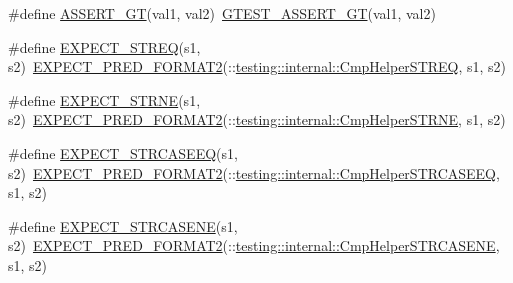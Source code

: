 \begin{DoxyCompactItemize}
\item 
\#define \mbox{\hyperlink{_obj__test_2lib_2googletest-release-1_88_81_2googletest_2include_2gtest_2gtest_8h_a16a882d4eafc9f8643867aea40879140}{A\+S\+S\+E\+R\+T\+\_\+\+GT}}(val1,  val2)~\mbox{\hyperlink{_obj__test_2lib_2googletest-release-1_88_81_2googletest_2include_2gtest_2gtest_8h_a088b9056fd1c1f316b41c22f64deb33a}{G\+T\+E\+S\+T\+\_\+\+A\+S\+S\+E\+R\+T\+\_\+\+GT}}(val1, val2)
\item 
\#define \mbox{\hyperlink{_obj__test_2lib_2googletest-release-1_88_81_2googletest_2include_2gtest_2gtest_8h_ad20f7b94ac5081e16f0005b94e95f0c6}{E\+X\+P\+E\+C\+T\+\_\+\+S\+T\+R\+EQ}}(s1,  s2)~\mbox{\hyperlink{_obj__test_2lib_2googletest-release-1_88_81_2googletest_2include_2gtest_2gtest__pred__impl_8h_af0141918615a5e2d5247e9cda8324dae}{E\+X\+P\+E\+C\+T\+\_\+\+P\+R\+E\+D\+\_\+\+F\+O\+R\+M\+A\+T2}}(\+::\mbox{\hyperlink{namespacetesting_1_1internal_a711a396ed8f636ecd14a850a89d181b6}{testing\+::internal\+::\+Cmp\+Helper\+S\+T\+R\+EQ}}, s1, s2)
\item 
\#define \mbox{\hyperlink{_obj__test_2lib_2googletest-release-1_88_81_2googletest_2include_2gtest_2gtest_8h_aee7e9c42f55549dbc0dfc42391eb9775}{E\+X\+P\+E\+C\+T\+\_\+\+S\+T\+R\+NE}}(s1,  s2)~\mbox{\hyperlink{_obj__test_2lib_2googletest-release-1_88_81_2googletest_2include_2gtest_2gtest__pred__impl_8h_af0141918615a5e2d5247e9cda8324dae}{E\+X\+P\+E\+C\+T\+\_\+\+P\+R\+E\+D\+\_\+\+F\+O\+R\+M\+A\+T2}}(\+::\mbox{\hyperlink{namespacetesting_1_1internal_af2d31c77ce73e1003a64bd7ca3564bbe}{testing\+::internal\+::\+Cmp\+Helper\+S\+T\+R\+NE}}, s1, s2)
\item 
\#define \mbox{\hyperlink{_obj__test_2lib_2googletest-release-1_88_81_2googletest_2include_2gtest_2gtest_8h_a740cab7e3eec5c178a64b4f558bde66e}{E\+X\+P\+E\+C\+T\+\_\+\+S\+T\+R\+C\+A\+S\+E\+EQ}}(s1,  s2)~\mbox{\hyperlink{_obj__test_2lib_2googletest-release-1_88_81_2googletest_2include_2gtest_2gtest__pred__impl_8h_af0141918615a5e2d5247e9cda8324dae}{E\+X\+P\+E\+C\+T\+\_\+\+P\+R\+E\+D\+\_\+\+F\+O\+R\+M\+A\+T2}}(\+::\mbox{\hyperlink{namespacetesting_1_1internal_a30dfeb01f1bc8087c7d05205d5fa75c1}{testing\+::internal\+::\+Cmp\+Helper\+S\+T\+R\+C\+A\+S\+E\+EQ}}, s1, s2)
\item 
\#define \mbox{\hyperlink{_obj__test_2lib_2googletest-release-1_88_81_2googletest_2include_2gtest_2gtest_8h_a07d0b5cbd3b5f7c8b6f44c609046ff07}{E\+X\+P\+E\+C\+T\+\_\+\+S\+T\+R\+C\+A\+S\+E\+NE}}(s1,  s2)~\mbox{\hyperlink{_obj__test_2lib_2googletest-release-1_88_81_2googletest_2include_2gtest_2gtest__pred__impl_8h_af0141918615a5e2d5247e9cda8324dae}{E\+X\+P\+E\+C\+T\+\_\+\+P\+R\+E\+D\+\_\+\+F\+O\+R\+M\+A\+T2}}(\+::\mbox{\hyperlink{namespacetesting_1_1internal_a7e31d489f06ab8f6a81a7729f0c377e7}{testing\+::internal\+::\+Cmp\+Helper\+S\+T\+R\+C\+A\+S\+E\+NE}}, s1, s2)

\end{DoxyCompactItemize}
